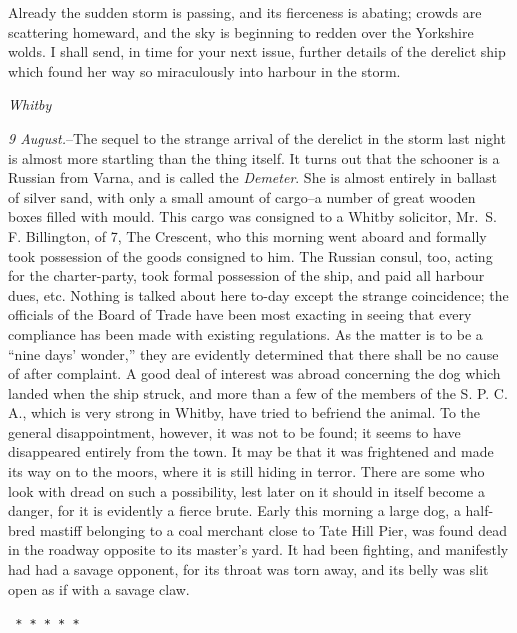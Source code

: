 \documentclass[12pt,openright]{book}
\begin{document}
Already the sudden storm is passing, and its fierceness is abating; crowds are scattering homeward, and the sky is beginning to redden over the Yorkshire wolds. I shall send, in time for your next issue, further details of the derelict ship which found her way so miraculously into harbour in the storm.

\textit{Whitby}

\textit{9 August.}–The sequel to the strange arrival of the derelict in the storm last night is almost more startling than the thing itself. It turns out that the schooner is a Russian from Varna, and is called the \textit{Demeter}. She is almost entirely in ballast of silver sand, with only a small amount of cargo–a number of great wooden boxes filled with mould. This cargo was consigned to a Whitby solicitor, Mr. S. F. Billington, of 7, The Crescent, who this morning went aboard and formally took possession of the goods consigned to him. The Russian consul, too, acting for the charter-party, took formal possession of the ship, and paid all harbour dues, etc. Nothing is talked about here to-day except the strange coincidence; the officials of the Board of Trade have been most exacting in seeing that every compliance has been made with existing regulations. As the matter is to be a “nine days’ wonder,” they are evidently determined that there shall be no cause of after complaint. A good deal of interest was abroad concerning the dog which landed when the ship struck, and more than a few of the members of the S. P. C. A., which is very strong in Whitby, have tried to befriend the animal. To the general disappointment, however, it was not to be found; it seems to have disappeared entirely from the town. It may be that it was frightened and made its way on to the moors, where it is still hiding in terror. There are some who look with dread on such a possibility, lest later on it should in itself become a danger, for it is evidently a fierce brute. Early this morning a large dog, a half-bred mastiff belonging to a coal merchant close to Tate Hill Pier, was found dead in the roadway opposite to its master’s yard. It had been fighting, and manifestly had had a savage opponent, for its throat was torn away, and its belly was slit open as if with a savage claw.

\texttt{   *       *       *       *       *}
\end{document}
